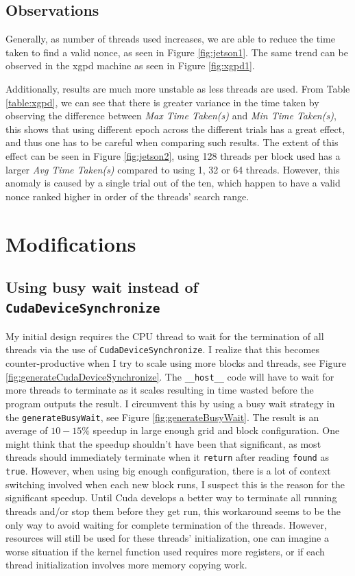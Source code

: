 \documentclass[a4paper]{article}
\begin{document}
\subsection{Observations}
Generally, as number of threads used increases, we are able to reduce the time taken to find a valid nonce, as seen in Figure \ref{fig:jetson1}. The same trend can be observed in the xgpd machine as seen in Figure \ref{fig:xgpd1}.

Additionally, results are much more unstable as less threads are used. From Table \ref{table:xgpd}, we can see that there is greater variance in the time taken by observing the difference between \emph{Max Time Taken(s)} and \emph{Min Time Taken(s)}, this shows that using different epoch across the different trials has a great effect, and thus one has to be careful when comparing such results. The extent of this effect can be seen in Figure \ref{fig:jetson2}, using 128 threads per block used has a larger \emph{Avg Time Taken(s)} compared to using 1, 32 or 64 threads. However, this anomaly is caused by a single trial out of the ten, which happen to have a valid nonce ranked higher in order of the threads' search range.


\section{Modifications}
\subsection{Using busy wait instead of \texttt{CudaDeviceSynchronize}}
My initial design requires the CPU thread to wait for the termination of all threads via the use of \texttt{CudaDeviceSynchronize}. I realize that this becomes counter-productive when I try to scale using more blocks and threads, see Figure \ref{fig:generateCudaDeviceSynchronize}. The \texttt{\_\_host\_\_} code will have to wait for more threads to terminate as it scales resulting in time wasted before the program outputs the result. I circumvent this by using a busy wait strategy in the \texttt{generateBusyWait}, see Figure \ref{fig:generateBusyWait}. The result is an average of $10-15\%$ speedup in large enough grid and block configuration. One might think that the speedup shouldn't have been that significant, as most threads should immediately terminate when it \texttt{return} after reading \texttt{found} as \texttt{true}. However, when using big enough configuration, there is a lot of context switching involved when each new block runs, I suspect this is the reason for the significant speedup. Until Cuda develops a better way to terminate all running threads and/or stop them before they get run, this workaround seems to be the only way to avoid waiting for complete termination of the threads. However, resources will still be used for these threads' initialization, one can imagine a worse situation if the kernel function used requires more registers, or if each thread initialization involves more memory copying work.
\end{document}
